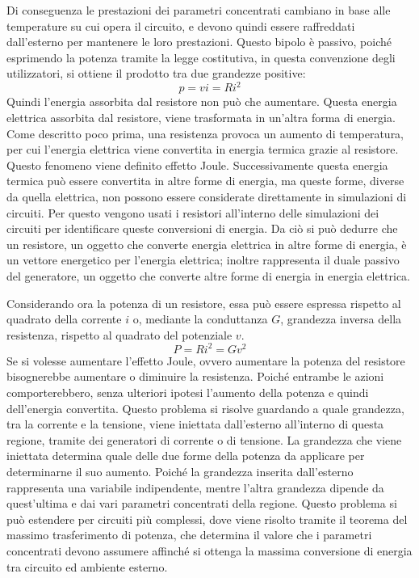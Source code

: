 \documentclass{article}
\numberwithin{equation}{subsection}
\begin{document}
Di conseguenza le prestazioni dei parametri concentrati cambiano in base alle temperature su cui opera il circuito, e devono quindi essere raffreddati dall'esterno per mantenere 
le loro prestazioni. Questo bipolo è passivo, poiché esprimendo la potenza tramite la legge costitutiva, in questa convenzione degli utilizzatori, si ottiene il prodotto 
tra due grandezze positive:
\begin{equation*}
    p=vi=Ri^2
\end{equation*}
Quindi l'energia assorbita dal resistore non può che aumentare. Questa energia elettrica assorbita dal resistore, viene trasformata in un'altra forma di energia. Come 
descritto poco prima, una resistenza provoca un aumento di temperatura, per cui l'energia elettrica viene convertita in energia termica grazie al resistore. Questo fenomeno 
viene definito effetto Joule. Successivamente questa energia termica può essere convertita in altre forme di energia, ma queste forme, diverse da quella elettrica, non possono 
essere considerate direttamente in simulazioni di circuiti. Per questo vengono usati i resistori all'interno delle simulazioni dei circuiti per identificare queste 
conversioni di energia. Da ciò si può dedurre che un resistore, un oggetto che converte energia elettrica in altre forme di energia, è un vettore energetico per l'energia 
elettrica; inoltre rappresenta il duale passivo del generatore, un oggetto che converte altre forme di energia in energia elettrica. 


Considerando ora la potenza di un resistore, essa può essere espressa rispetto al quadrato della corrente $i$ o, mediante la conduttanza $G$, grandezza inversa della resistenza, 
rispetto al quadrato del potenziale $v$. 
\begin{equation*}
    P=Ri^2=Gv^2
\end{equation*}
Se si volesse aumentare l'effetto Joule, ovvero aumentare la potenza del resistore bisognerebbe aumentare o diminuire la resistenza. Poiché entrambe le azioni comporterebbero, 
senza ulteriori ipotesi l'aumento della potenza e quindi dell'energia convertita. Questo problema si risolve guardando a quale grandezza, tra la corrente e la tensione, 
viene iniettata dall'esterno all'interno di questa regione, tramite dei generatori di corrente o di tensione. La grandezza che viene iniettata determina quale delle due 
forme della potenza da applicare per determinarne il suo aumento. Poiché la grandezza inserita dall'esterno rappresenta una variabile indipendente, mentre l'altra 
grandezza dipende da quest'ultima e dai vari parametri concentrati della regione. Questo problema si può estendere per circuiti più complessi, dove viene risolto tramite 
il teorema del massimo trasferimento di potenza, che determina il valore che i parametri concentrati devono assumere affinché si ottenga la massima conversione di energia 
tra circuito ed ambiente esterno.  
\end{document}

